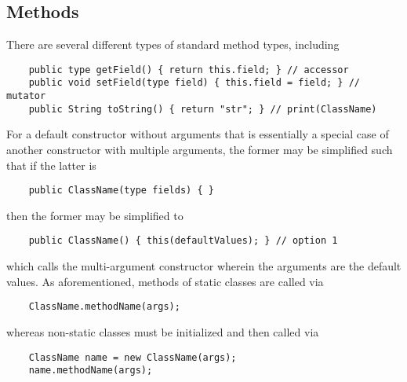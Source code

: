 \documentclass[letterpaper, openany, justified]{tufte-book}
\begin{document}
\begin{fullwidth}
\section{Methods}
There are several different types of standard method types, including
\begin{lstlisting}
    public type getField() { return this.field; } // accessor
    public void setField(type field) { this.field = field; } // mutator
    public String toString() { return "str"; } // print(ClassName)
\end{lstlisting}
For a default constructor without arguments that is essentially a special case of another constructor with multiple arguments, the former may be simplified such that if the latter is
\begin{lstlisting}
    public ClassName(type fields) { }
\end{lstlisting}
then the former may be simplified to
\begin{lstlisting}
    public ClassName() { this(defaultValues); } // option 1
\end{lstlisting}
which calls the multi-argument constructor wherein the arguments are the default values. As aforementioned, methods of static classes are called via
\begin{lstlisting}
    ClassName.methodName(args);
\end{lstlisting}
whereas non-static classes must be initialized and then called via
\begin{lstlisting}
    ClassName name = new ClassName(args);
    name.methodName(args);
\end{lstlisting}


\end{fullwidth}
\end{document}
